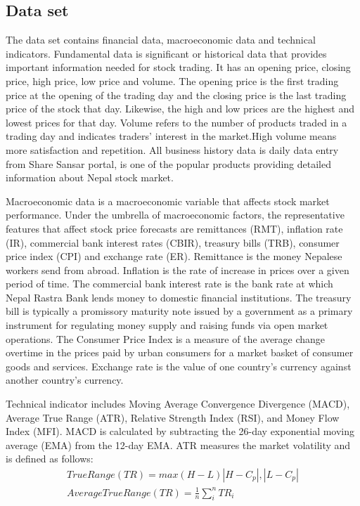 \subsection{Data set}
\vspace{-18pt}
The data set contains financial data, macroeconomic data and technical indicators. Fundamental data is significant or historical data that provides important information needed for stock trading. It has an opening price, closing price, high price, low price and volume. The opening price is the first trading price at the opening of the trading day and the closing price is the last trading price of the stock that day. Likewise, the high and low prices are the highest and lowest prices for that day. Volume refers to the number of products traded in a trading day and indicates traders' interest in the market.High volume means more satisfaction and repetition. All business history data is daily data entry from Share Sansar portal, is one of the popular products providing detailed information about Nepal stock market.
\par
Macroeconomic data is a macroeconomic variable that affects stock market performance. Under the umbrella of macroeconomic factors, the representative features that affect stock price forecasts are remittances (RMT), inflation rate (IR), commercial bank interest rates (CBIR), treasury bills (TRB), consumer price index (CPI) and exchange rate (ER). Remittance is the money Nepalese workers send from abroad. Inflation is the rate of increase in prices over a given period of time.  The commercial bank interest rate is the bank rate at which Nepal Rastra Bank lends money to domestic financial institutions. The treasury bill is typically a promissory maturity note issued by a government as a primary instrument for regulating money supply and raising funds via open market operations. The Consumer Price Index is a measure of the average change overtime in the prices paid by urban consumers for a market basket of consumer goods and services. Exchange rate is the value of one country's currency against another country's currency.
 \par 
Technical indicator includes Moving Average Convergence Divergence (MACD), Average True Range (ATR), Relative Strength Index (RSI), and Money Flow Index (MFI). MACD is calculated by subtracting the 26-day exponential moving average (EMA) from the 12-day EMA. ATR measures the market volatility and is defined as follows:\newpage
\begin{eqnarray}
True Range(TR) = max{(H-L)|H-C_p|,|L-C_p|}\\
Average True Range(TR) = \frac{1}{n} \sum_{i}^{n}T R_i
\end{eqnarray}
